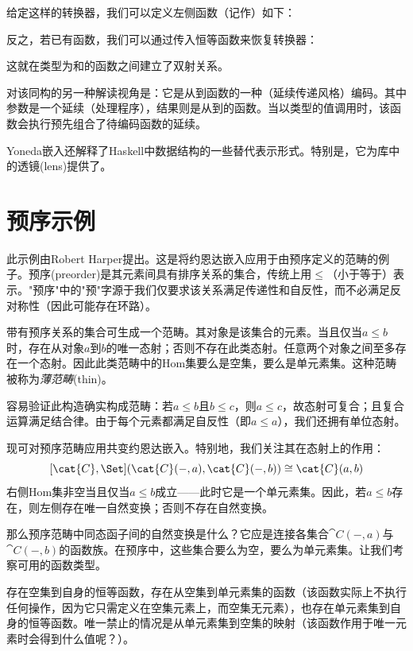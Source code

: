 给定这样的转换器，我们可以定义左侧函数（记作）如下：

反之，若已有函数，我们可以通过传入恒等函数来恢复转换器：

这就在类型为和的函数之间建立了双射关系。

对该同构的另一种解读视角是：它是从到函数的一种（延续传递风格）编码。其中参数是一个延续（处理程序），结果则是从到的函数。当以类型的值调用时，该函数会执行预先组合了待编码函数的延续。

Yoneda嵌入还解释了Haskell中数据结构的一些替代表示形式。特别是，它为库中的透镜(lens)提供了。

\section{预序示例}

此示例由Robert Harper提出。这是将约恩达嵌入应用于由预序定义的范畴的例子。预序(preorder)是其元素间具有排序关系的集合，传统上用$\leqslant$（小于等于）表示。"预序"中的"预"字源于我们仅要求该关系满足传递性和自反性，而不必满足反对称性（因此可能存在环路）。

带有预序关系的集合可生成一个范畴。其对象是该集合的元素。当且仅当$a \leqslant b$时，存在从对象$a$到$b$的唯一态射；否则不存在此类态射。任意两个对象之间至多存在一个态射。因此此类范畴中的Hom集要么是空集，要么是单元素集。这种范畴被称为\emph{薄范畴}(thin)。

容易验证此构造确实构成范畴：若$a \leqslant b$且$b \leqslant c$，则$a \leqslant c$，故态射可复合；且复合运算满足结合律。由于每个元素都满足自反性（即$a \leqslant a$），我们还拥有单位态射。

现可对预序范畴应用共变约恩达嵌入。特别地，我们关注其在态射上的作用：
$$[\cat{C}, \Set](\cat{C}(-, a), \cat{C}(-, b)) \cong \cat{C}(a, b)$$
右侧Hom集非空当且仅当$a \leqslant b$成立——此时它是一个单元素集。因此，若$a \leqslant b$存在，则左侧存在唯一自然变换；否则不存在自然变换。

那么预序范畴中同态函子间的自然变换是什么？它应是连接各集合$\cat{C}(-, a)$与$\cat{C}(-, b)$的函数族。在预序中，这些集合要么为空，要么为单元素集。让我们考察可用的函数类型。

存在空集到自身的恒等函数，存在从空集到单元素集的函数（该函数实际上不执行任何操作，因为它只需定义在空集元素上，而空集无元素），也存在单元素集到自身的恒等函数。唯一禁止的情况是从单元素集到空集的映射（该函数作用于唯一元素时会得到什么值呢？）。

